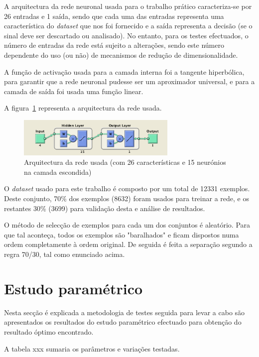 \documentclass{article}
\begin{document}
A arquitectura da rede neuronal usada para o trabalho prático caracteriza-se por 26 entradas e 1 saída, sendo que cada uma das entradas representa uma característica do \textit{dataset} que nos foi fornecido e a saída representa a decisão (se o sinal deve ser descartado ou analisado). No entanto, para os testes efectuados, o número de entradas da rede está sujeito a alterações, sendo este número dependente do uso (ou não) de mecanismos de redução de dimensionalidade.

A função de activação usada para a camada interna foi a tangente hiperbólica, para garantir que a rede neuronal pudesse ser um aproximador universal, e para a camada de saída foi usada uma função linear.

A figura~\ref{nn_architecture} representa a arquitectura da rede usada.

\begin{figure}[!h]
  \centering
  \includegraphics[width=3in]{figures/nn_architecture}
  \caption{Arquitectura da rede usada (com 26 características e 15 neurónios na camada escondida)}
  \label{nn_architecture}
\end{figure}

O \textit{dataset} usado para este trabalho é composto por um total de 12331 exemplos. Deste conjunto, 70\% dos exemplos (8632) foram usados para treinar a rede, e os restantes 30\% (3699) para validação desta e análise de resultados.

O método de selecção de exemplos para cada um dos conjuntos é aleatório. Para que tal aconteça, todos os exemplos são "baralhados" e ficam dispostos numa ordem completamente à ordem original. De seguida é feita a separação segundo a regra 70/30, tal como enunciado acima.

\clearpage
\section{Estudo paramétrico}
\indent \indent Nesta secção é explicada a metodologia de testes seguida para levar a cabo são apresentados os resultados do estudo paramétrico efectuado para obtenção do resultado óptimo encontrado.



A tabela xxx sumaria os parâmetros e variações testadas.
\end{document}
